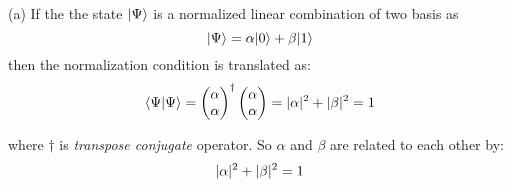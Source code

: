 \begin{homeworkProblem}
\begin{homeworkSectiom}{(a)}
If the the state $|\Psi\rangle$ is a normalized linear combination of two basis as 
$$|\Psi\rangle=\alpha|0\rangle+\beta|1\rangle$$
then the normalization condition is translated as:
\begin{equation}
\langle\Psi|\Psi\rangle=
\begin{pmatrix}
\alpha\\
\alpha
\end{pmatrix}^\dagger
\begin{pmatrix}
\alpha\\
\alpha
\end{pmatrix}
=\lvert\alpha\rvert^2+\lvert\beta\rvert^2=1
\end{equation} 

where $\dagger$ is \textit{transpose conjugate} operator. So $\alpha$ and $\beta$ are related to each other by:
\begin{equation}
\lvert\alpha\rvert^2+\lvert\beta\rvert^2=1
\end{equation}


\end{homeworkSectiom}
\end{homeworkProblem}
